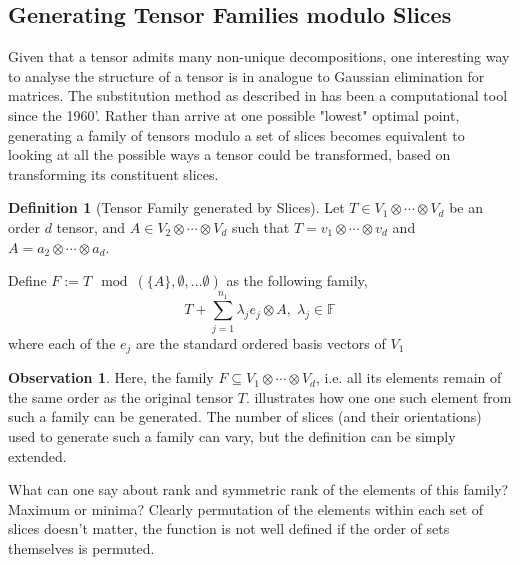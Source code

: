 \documentclass[12pt,a4paper,oneside]{book}
\theoremstyle{definition}
\newtheorem{definition}{Definition}[section]
\newtheorem*{observation}{Observation}
\begin{document}
\subsection{Generating Tensor Families modulo Slices}\label{subsection:familymoduloslices}
Given that a tensor admits many non-unique decompositions, one interesting way to analyse the structure of a tensor is in analogue to Gaussian elimination for matrices. The substitution method as described in \cite{landsberg_abelian_2017,alexeev_tensor_2011} has been a computational tool since the 1960'. Rather than arrive at one possible "lowest" optimal point, generating a family of tensors modulo a set of slices becomes equivalent to looking at all the possible ways a tensor could be transformed, based on transforming its constituent slices.
\begin{definition}[Tensor Family generated by Slices]\label{defn:familymoduloslices}
    Let $T \in V_1 \otimes \cdots \otimes V_d$ be an order $d$ tensor, and $A \in V_2 \otimes \cdots \otimes V_d$ such that $T = v_1 \otimes \cdots \otimes v_d$ and $A = a_2 \otimes \cdots \otimes a_d$.
    
    Define $F:= T\mod(\{A\}, \emptyset, \ldots \emptyset)$ as the following family,
    $$T + \sum_{j=1}^{n_1} \lambda_j e_j \otimes A, \;\lambda_j \in \mathbb{F}$$where each of the $e_j$ are the standard ordered basis vectors of $V_1$
\end{definition}
\begin{observation}
    Here, the family $F \subseteq V_1 \otimes \cdots \otimes V_d$, i.e. all its elements remain of the same order as the original tensor $T$.  illustrates how one one such element from such a family can be generated. The number of slices (and their orientations) used to generate such a family can vary, but the definition can be simply extended.
\end{observation}
What can one say about rank and symmetric rank of the elements of this family? Maximum or minima?
Clearly permutation of the elements within each set of slices doesn't matter, the function is not well defined if the order of sets themselves is permuted. 
\end{document}
